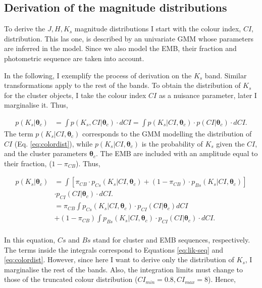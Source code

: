 \subsection{Derivation of the magnitude distributions}
\label{subsect:deriveluminosity}
To derive the $J,H,K_s$ magnitude distributions I start with the colour index, $CI$, distribution. This las one, is described by an univariate GMM whose parameters are inferred in the model. Since we also model the EMB, their fraction and photometric sequence are taken into account. 

In the following, I exemplify the process of derivation on the $K_s$ band. Similar transformations apply to the rest of the bands. 
To obtain the distribution of $K_s$ for the cluster objects, I take the colour index $CI$ as a nuisance parameter, later I marginalise it. Thus, 

\begin{align}
p(K_s | \boldsymbol{\theta}_c) & = \int p(K_s,CI | \boldsymbol{\theta}_c) \cdot dCI =  \int p(K_s | CI ,\boldsymbol{\theta}_c) \cdot p(CI|\boldsymbol{\theta}_c)\cdot dCI. \nonumber
\end{align}
The term $p(K_s | CI ,\boldsymbol{\theta}_c)$ corresponds to the GMM modelling the distribution of $CI$ (Eq. \ref{eq:colordist}), while $p(K_s | CI ,\boldsymbol{\theta}_c)$ is the probability of $K_s$ given the $CI$, and the cluster parameters $\boldsymbol{\theta}_c$. The EMB are included with an amplitude equal to their fraction, ($1-\pi_{CB}$). Thus,

\begin{align}
p(K_s | \boldsymbol{\theta}_c) & =  \int \left[\pi_{CB}\cdot p_{Cs}(K_s| CI, \boldsymbol{\theta}_c) + (1-\pi_{CB})\cdot p_{Bs}(K_s| CI, \boldsymbol{\theta}_c)\right]\nonumber \\& \cdot p_{CI}(CI|\boldsymbol{\theta}_c)\cdot dCI. \nonumber \\
& =   \pi_{CB} \int p_{Cs}(K_s| CI, \boldsymbol{\theta}_c) \cdot p_{CI}(CI|\boldsymbol{\theta}_c) dCI \nonumber \\
&+ (1-\pi_{CB})\int p_{Bs}(K_s| CI, \boldsymbol{\theta}_c) \cdot p_{CI}(CI|\boldsymbol{\theta}_c)\cdot  dCI. \nonumber \\
\end{align}

In this equation, $Cs$ and $Bs$ stand for cluster and EMB sequences, respectively. The terms inside the integrals correspond to Equations \ref{eq:lik-seq} and \ref{eq:colordist}. However, since here I want to derive only the distribution of $K_s$, I marginalise the rest of the bands. Also, the integration limits must change to those of the truncated colour distribution ($CI_{min}=0.8, CI_{max}=8$). Hence,

